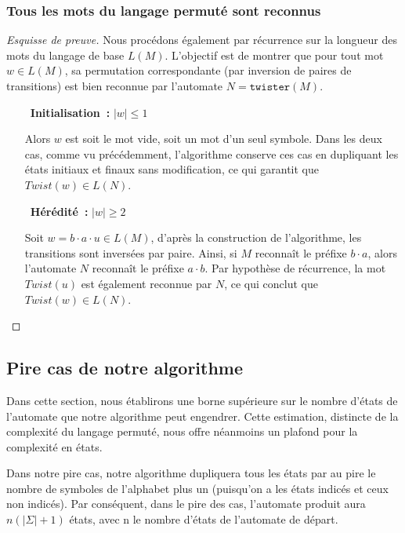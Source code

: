 \subsubsection{Tous les mots du langage permuté sont reconnus}

\begin{proof}[Esquisse de preuve]
  Nous procédons également par récurrence sur la longueur des mots du langage
  de base \(L(M)\). L’objectif est de montrer que pour tout mot \(w \in
  L(M)\), sa permutation correspondante (par inversion de paires de
  transitions) est bien reconnue par l’automate \(N = \texttt{twister}(M)\).

  \vphantom{}

  \begin{itemize}
    \item[\bullet~\textbf{Initialisation~:}] \(\lvert w \rvert \leq 1\)

      Alors \(w\) est soit le mot vide, soit un mot d’un seul symbole. Dans
      les deux cas, comme vu précédemment, l’algorithme conserve ces cas en
      dupliquant les états initiaux et finaux sans modification, ce qui
      garantit que \(Twist(w) \in L(N)\).

    \vphantom{}

    \item[\bullet~\textbf{Hérédité~:}]  \(\lvert w \rvert \geq 2\)
      
      Soit \(w = b \cdot a \cdot u \in L(M)\), d'après la construction de
      l’algorithme, les transitions sont inversées par paire. Ainsi, si
      \(M\) reconnaît le préfixe \(b \cdot a\), alors l’automate \(N\)
      reconnaît le préfixe \(a \cdot b\). Par hypothèse de récurrence, la
      mot \(Twist(u)\) est également reconnue par \(N\), ce qui conclut que
      \(Twist(w) \in L(N)\).
  \end{itemize}
\end{proof}

\subsection{Pire cas de notre algorithme}

Dans cette section, nous établirons une borne supérieure sur le nombre
d’états de l’automate que notre algorithme peut engendrer. Cette estimation,
distincte de la complexité du langage permuté, nous offre néanmoins un
plafond pour la complexité en états.

\vphantom{}

Dans notre pire cas, notre algorithme dupliquera tous les états par au pire le
nombre de symboles de l’alphabet plus un (puisqu'on a les états indicés et
ceux non indicés). Par conséquent, dans le pire des cas, l’automate produit
aura \(n(\lvert \Sigma \rvert + 1)\) états, avec n le nombre d’états de
l’automate de départ.

